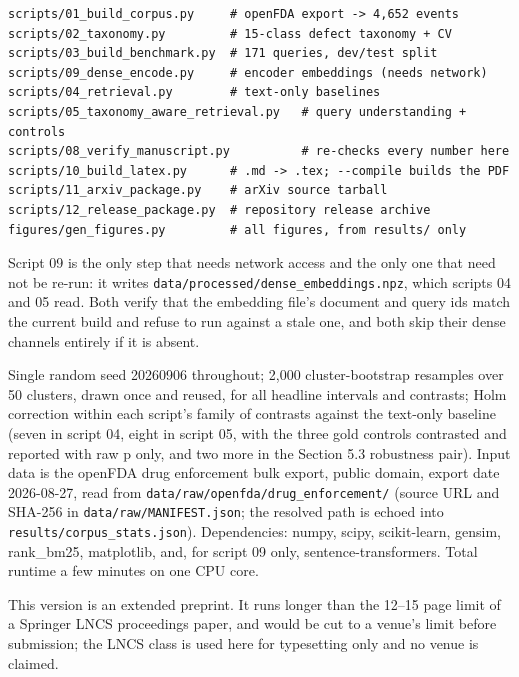 \documentclass[runningheads]{llncs}
\begin{document}
\par\noindent\begin{minipage}{\linewidth}
\begin{verbatim}
scripts/01_build_corpus.py     # openFDA export -> 4,652 events
scripts/02_taxonomy.py         # 15-class defect taxonomy + CV
scripts/03_build_benchmark.py  # 171 queries, dev/test split
scripts/09_dense_encode.py     # encoder embeddings (needs network)
scripts/04_retrieval.py        # text-only baselines
scripts/05_taxonomy_aware_retrieval.py   # query understanding + controls
scripts/08_verify_manuscript.py          # re-checks every number here
scripts/10_build_latex.py      # .md -> .tex; --compile builds the PDF
scripts/11_arxiv_package.py    # arXiv source tarball
scripts/12_release_package.py  # repository release archive
figures/gen_figures.py         # all figures, from results/ only
\end{verbatim}
\end{minipage}

Script 09 is the only step that needs network access and the only one that need not be re-run: it writes \texttt{data/processed/\allowbreak{}dense\_\allowbreak{}embeddings.npz}, which scripts 04 and 05 read. Both verify that the embedding file's document and query ids match the current build and refuse to run against a stale one, and both skip their dense channels entirely if it is absent.

Single random seed 20260906 throughout; 2,000 cluster-bootstrap resamples over 50 clusters, drawn once and reused, for all headline intervals and contrasts; Holm correction within each script's family of contrasts against the text-only baseline (seven in script 04, eight in script 05, with the three gold controls contrasted and reported with raw p only, and two more in the Section 5.3 robustness pair). Input data is the openFDA drug enforcement bulk export, public domain, export date 2026-08-27, read from \texttt{data/raw/\allowbreak{}openfda/\allowbreak{}drug\_\allowbreak{}enforcement/} (source URL and SHA-256 in \texttt{data/raw/\allowbreak{}MANIFEST.json}; the resolved path is echoed into \texttt{results/corpus\_\allowbreak{}stats.json}). Dependencies: numpy, scipy, scikit-learn, gensim, rank\_bm25, matplotlib, and, for script 09 only, sentence-transformers. Total runtime a few minutes on one CPU core.

This version is an extended preprint. It runs longer than the 12--15 page limit of a Springer LNCS proceedings paper, and would be cut to a venue's limit before submission; the LNCS class is used here for typesetting only and no venue is claimed.
\end{document}
